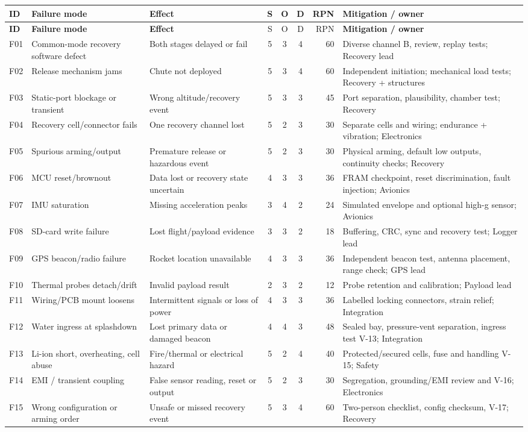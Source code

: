 \footnotesize
{}
\begin{longtable}{@{}L{9mm}L{30mm}L{32mm}c c c r L{37mm}@{}}
\toprule{}\textbf{ID}&\textbf{Failure mode}&\textbf{Effect}&\textbf{S}&\textbf{O}&\textbf{D}&\textbf{RPN}&\textbf{Mitigation / owner}\\\midrule\endfirsthead
\toprule{}\textbf{ID}&\textbf{Failure mode}&\textbf{Effect}&S&O&D&RPN&\textbf{Mitigation / owner}\\\midrule\endhead
\bottomrule\endlastfoot
F01 & Common-mode recovery software defect & Both stages delayed or fail & 5 & 3 & 4 & 60 & Diverse channel B, review, replay tests; Recovery lead\\
F02 & Release mechanism jams & Chute not deployed & 5 & 3 & 4 & 60 & Independent initiation; mechanical load tests; Recovery + structures\\
F03 & Static-port blockage or transient & Wrong altitude/recovery event & 5 & 3 & 3 & 45 & Port separation, plausibility, chamber test; Recovery\\
F04 & Recovery cell/connector fails & One recovery channel lost & 5 & 2 & 3 & 30 & Separate cells and wiring; endurance + vibration; Electronics\\
F05 & Spurious arming/output & Premature release or hazardous event & 5 & 2 & 3 & 30 & Physical arming, default low outputs, continuity checks; Recovery\\
F06 & MCU reset/brownout & Data lost or recovery state uncertain & 4 & 3 & 3 & 36 & FRAM checkpoint, reset discrimination, fault injection; Avionics\\
F07 & IMU saturation & Missing acceleration peaks & 3 & 4 & 2 & 24 & Simulated envelope and optional high-g sensor; Avionics\\
F08 & SD-card write failure & Lost flight/payload evidence & 3 & 3 & 2 & 18 & Buffering, CRC, sync and recovery test; Logger lead\\
F09 & GPS beacon/radio failure & Rocket location unavailable & 4 & 3 & 3 & 36 & Independent beacon test, antenna placement, range check; GPS lead\\
F10 & Thermal probes detach/drift & Invalid payload result & 2 & 3 & 2 & 12 & Probe retention and calibration; Payload lead\\
F11 & Wiring/PCB mount loosens & Intermittent signals or loss of power & 4 & 3 & 3 & 36 & Labelled locking connectors, strain relief; Integration\\
F12 & Water ingress at splashdown & Lost primary data or damaged beacon & 4 & 4 & 3 & 48 & Sealed bay, pressure-vent separation, ingress test V-13; Integration\\
F13 & Li-ion short, overheating, cell abuse & Fire/thermal or electrical hazard & 5 & 2 & 4 & 40 & Protected/secured cells, fuse and handling V-15; Safety\\
F14 & EMI / transient coupling & False sensor reading, reset or output & 5 & 2 & 3 & 30 & Segregation, grounding/EMI review and V-16; Electronics\\
F15 & Wrong configuration or arming order & Unsafe or missed recovery event & 5 & 3 & 4 & 60 & Two-person checklist, config checksum, V-17; Recovery\\
\end{longtable}
